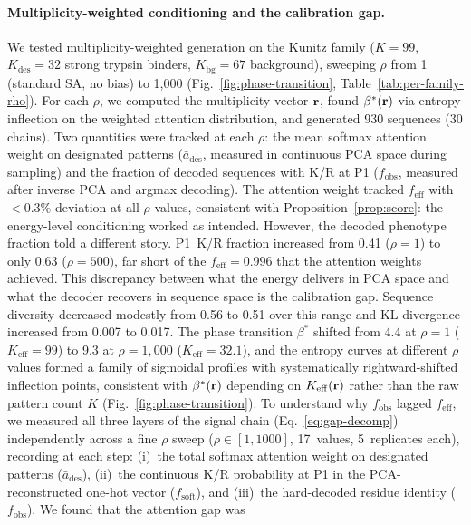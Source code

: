 \paragraph{Multiplicity-weighted conditioning and the calibration gap.}
We tested multiplicity-weighted generation on the Kunitz family ($K = 99$,
$K_{\mathrm{des}} = 32$ strong trypsin binders, $K_{\mathrm{bg}} = 67$ background),
sweeping $\rho$ from 1 (standard SA, no bias) to 1{,}000 (Fig.~\ref{fig:phase-transition}, Table~\ref{tab:per-family-rho}). For each $\rho$, we
computed the multiplicity vector $\mathbf{r}$, found $\beta^{*}(\mathbf{r})$ via entropy inflection on the
weighted attention distribution, and generated 930 sequences (30 chains). Two quantities were tracked at each $\rho$: the mean softmax attention weight on designated
patterns ($\bar{a}_{\mathrm{des}}$, measured in continuous PCA space during sampling) and the
fraction of decoded sequences with K/R at P1 ($f_{\mathrm{obs}}$, measured after inverse PCA
and argmax decoding). The attention weight tracked $f_{\mathrm{eff}}$ with $< 0.3\%$ deviation
at all $\rho$ values, consistent with Proposition~\ref{prop:score}: the energy-level
conditioning worked as intended. However, the decoded phenotype fraction told a different story. P1~K/R fraction increased
from 0.41 ($\rho=1$) to only 0.63 ($\rho=500$), far short of the $f_{\mathrm{eff}} = 0.996$
that the attention weights achieved. This discrepancy between what the energy delivers in PCA
space and what the decoder recovers in sequence space is the calibration gap. Sequence diversity decreased modestly from 0.56 to 0.51 over this range and
KL divergence increased from 0.007 to 0.017. The phase transition
$\beta^{*}$ shifted from 4.4 at $\rho=1$ ($K_{\mathrm{eff}} = 99$) to 9.3 at
$\rho=1{,}000$ ($K_{\mathrm{eff}} = 32.1$), and the entropy curves at different $\rho$ values
formed a family of sigmoidal profiles with systematically rightward-shifted inflection points,
consistent with $\beta^{*}(\mathbf{r})$ depending on $K_{\mathrm{eff}}(\mathbf{r})$ rather than the raw
pattern count $K$ (Fig.~\ref{fig:phase-transition}). To understand why $f_{\mathrm{obs}}$
lagged $f_{\mathrm{eff}}$, we measured all three layers of the signal chain
(Eq.~\ref{eq:gap-decomp}) independently across a fine $\rho$ sweep ($\rho \in [1, 1000]$,
17~values, 5~replicates each), recording at each step: (i)~the total softmax attention weight
on designated patterns ($\bar{a}_{\mathrm{des}}$), (ii)~the continuous K/R probability at P1 in
the PCA-reconstructed one-hot vector ($f_{\mathrm{soft}}$), and (iii)~the hard-decoded residue
identity ($f_{\mathrm{obs}}$). We found that the attention gap was
